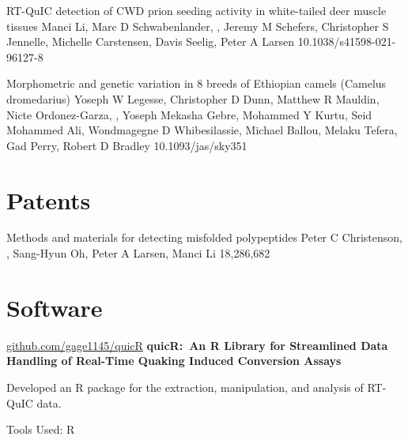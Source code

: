 \documentclass{resume}
\begin{document}
\begin{samepage}
            {RT-QuIC detection of CWD prion seeding activity in white-tailed deer muscle tissues}
            {Manci Li, Marc D Schwabenlander, \me{}, Jeremy M Schefers, Christopher S Jennelle, Michelle Carstensen, Davis Seelig, Peter A Larsen}
            {10.1038/s41598-021-96127-8}

            {Morphometric and genetic variation in 8 breeds of Ethiopian camels (Camelus dromedarius)}
            {Yoseph W Legesse, Christopher D Dunn, Matthew R Mauldin, Nicte Ordonez-Garza, \me{}, Yoseph Mekasha Gebre, Mohammed Y Kurtu, Seid Mohammed Ali, Wondmagegne D Whibesilassie, Michael Ballou, Melaku Tefera, Gad Perry, Robert D Bradley}
            {10.1093/jas/sky351}

        \end{samepage}


    \section{Patents}

        \begin{samepage}
            {Methods and materials for detecting misfolded polypeptides}
            {Peter C Christenson, \me{}, Sang-Hyun Oh, Peter A Larsen, Manci Li}
            {18,286,682}
        \end{samepage}
    

    \section{Software}

        \begin{twocolentry}{\href{https://github.com/gage1145/quicR}{github.com/gage1145/quicR}}
            \textbf{quicR:\ An R Library for Streamlined Data Handling of Real-Time Quaking Induced Conversion Assays}
        \end{twocolentry}

        \begin{onecolentry}
            \begin{highlights}
                \item Developed an R package for the extraction, manipulation, and analysis of RT-QuIC data.
                \item Tools Used: R
            \end{highlights}
        \end{onecolentry}
\end{document}
